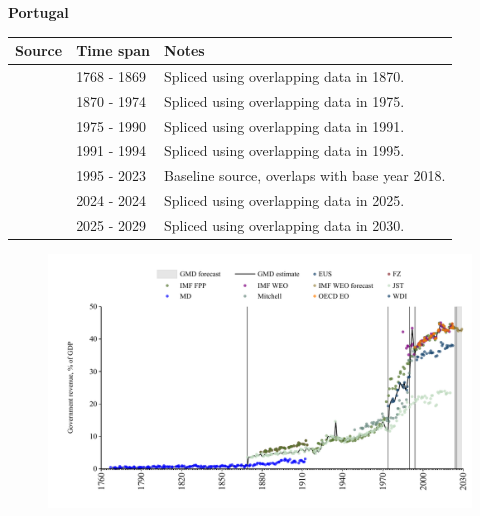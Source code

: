 \documentclass[12pt,a4paper,landscape]{article}
\begin{document}
\begin{adjustbox}{max totalsize={\paperwidth}{\paperheight},center}
\begin{minipage}[t][\textheight][t]{\textwidth}
\vspace*{0.5cm}
{}
\begin{center}
{\Large\bfseries Portugal}
\end{center}
\vspace{0.5cm}
\begin{table}[H]
\centering
\small
\begin{tabular}{|l|l|l|}
\hline
\textbf{Source} & \textbf{Time span} & \textbf{Notes} \\
\hline
\rowcolor{white}\cite{MD}& 1768 - 1869 &Spliced using overlapping data in 1870.\\
\rowcolor{lightgray}\cite{JST}& 1870 - 1974 &Spliced using overlapping data in 1975.\\
\rowcolor{white}\cite{WDI}& 1975 - 1990 &Spliced using overlapping data in 1991.\\
\rowcolor{lightgray}\cite{IMF_WEO}& 1991 - 1994 &Spliced using overlapping data in 1995.\\
\rowcolor{white}\cite{OECD_EO}& 1995 - 2023 &Baseline source, overlaps with base year 2018.\\
\rowcolor{lightgray}\cite{EUS}& 2024 - 2024 &Spliced using overlapping data in 2025.\\
\rowcolor{white}\cite{IMF_WEO_forecast}& 2025 - 2029 &Spliced using overlapping data in 2030.\\
\hline
\end{tabular}
\end{table}
\begin{figure}[H]
\centering
\includegraphics[width=\textwidth,height=0.6\textheight,keepaspectratio]{graphs/PRT_govrev_GDP.pdf}
\end{figure}
\end{minipage}
\end{adjustbox}
\end{document}
